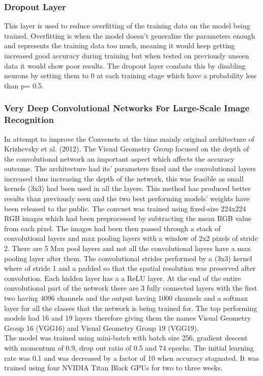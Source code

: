\documentclass{csfyp}
\newcommand\tab[1][1cm]{\hspace*{#1}}
\begin{document}
\subsubsection{Dropout Layer}
This layer is used to reduce overfitting of the training data on the model being trained. Overfitting is when the model doesn’t generalize the parameters enough and represents the training data too much, meaning it would keep getting increased good accuracy during training but when tested on previously unseen data it would show poor results. The dropout layer combats this by disabling neurons by setting them to 0 at each training stage which have a probability less than p= 0.5. 

\subsubsection{Very Deep Convolutional Networks For Large-Scale Image Recognition}
In attempt to improve the Convenets  at the time mainly original architecture of Krizhevsky et al. (2012). The Visual Geometry Group focused on the depth of the convolutional network an important aspect which affects the accuracy outcome.  The architecture had its’ parameters fixed and the convolutional layers increased thus increasing the depth of the network, this was feasible as small kernels (3x3) had been used in all the layers. This method has produced better results than previously seen and the two best performing models’ weights have been released to the public. The convnet was trained using fixed-size 224x224 RGB images which had been preprocessed by subtracting the mean RGB value from each pixel. The images had been then passed through a stack of convolutional layers and max pooling layers with a window of 2x2 pixels of stride 2. There are 5 Max pool layers and not all the convolutional layers have a max pooling layer after them. The convolutional strides performed by a (3x3) kernel where of stride 1 and a padded so that the spatial resolution was preserved after convolution. Each hidden layer has a a ReLU layer. At the end of the entire convolutional part of the network there are 3 fully connected layers with the first two having 4096 channels and the output having 1000 channels and a softmax layer for all the classes that the network is being trained for.  The top performing models had 16 and 19 layers therefore giving them the names Visual Geometry Group 16 (VGG16) and Visual Geometry Group 19 (VGG19).
\\
\tab
The model was trained using mini-batch with batch size 256, gradient descent with momentum of 0.9, drop out ratio of 0.5 and 74 epochs. The initial  learning rate was 0.1 and was decreased by a factor of 10 when accuracy stagnated. It was trained using four NVIDIA Titan Black GPUs for two to three weeks.  
\end{document}
